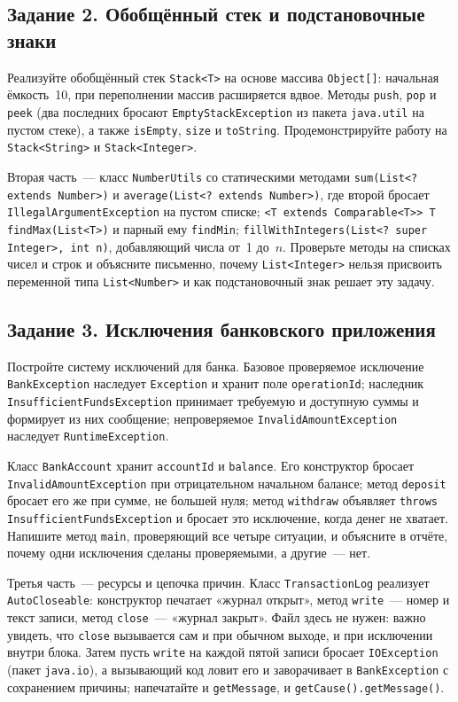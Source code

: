 \subsection*{Задание 2. Обобщённый стек и подстановочные знаки}

Реализуйте обобщённый стек \texttt{Stack<T>} на основе массива
\texttt{Object[]}: начальная ёмкость~10, при переполнении массив расширяется
вдвое. Методы \texttt{push}, \texttt{pop} и \texttt{peek} (два последних
бросают \texttt{EmptyStackException} из пакета \texttt{java.util} на пустом
стеке), а также \texttt{isEmpty}, \texttt{size} и \texttt{toString}.
Продемонстрируйте работу на
\texttt{Stack<String>} и \texttt{Stack<Integer>}.

Вторая часть~--- класс \texttt{NumberUtils} со статическими методами
\texttt{sum(List<? extends Number>)} и \texttt{average(List<? extends Number>)},
где второй бросает \texttt{IllegalArgumentException} на пустом списке;
\texttt{<T extends Comparable<T>> T findMax(List<T>)} и парный ему
\texttt{findMin}; \texttt{fillWithIntegers(List<? super Integer>, int n)},
добавляющий числа от~1 до~$n$. Проверьте методы на списках чисел и строк и
объясните письменно, почему \texttt{List<Integer>} нельзя присвоить переменной
типа \texttt{List<Number>} и как подстановочный знак решает эту задачу.

\subsection*{Задание 3. Исключения банковского приложения}

Постройте систему исключений для банка. Базовое проверяемое исключение
\texttt{BankException} наследует \texttt{Exception} и хранит поле
\texttt{operationId}; наследник \texttt{InsufficientFundsException} принимает
требуемую и доступную суммы и формирует из них сообщение; непроверяемое
\texttt{InvalidAmountException} наследует \texttt{RuntimeException}.

Класс \texttt{BankAccount} хранит \texttt{accountId} и \texttt{balance}. Его
конструктор бросает \texttt{InvalidAmountException} при отрицательном начальном
балансе; метод \texttt{deposit} бросает его же при сумме, не большей нуля;
метод \texttt{withdraw} объявляет \texttt{throws InsufficientFundsException} и
бросает это исключение, когда денег не хватает. Напишите метод \texttt{main},
проверяющий все четыре ситуации, и объясните в отчёте, почему одни исключения
сделаны проверяемыми, а другие~--- нет.

Третья часть~--- ресурсы и цепочка причин. Класс \texttt{TransactionLog}
реализует \texttt{AutoCloseable}: конструктор печатает «журнал открыт», метод
\texttt{write}~--- номер и текст записи, метод \texttt{close}~--- «журнал
закрыт». Файл здесь не нужен: важно увидеть,
что \texttt{close} вызывается сам и при обычном выходе, и при исключении внутри
блока. Затем пусть \texttt{write} на каждой пятой записи бросает
\texttt{IOException} (пакет \texttt{java.io}), а вызывающий код ловит его и
заворачивает в \texttt{BankException} с сохранением причины; напечатайте и
\texttt{getMessage}, и \texttt{getCause().getMessage()}.

